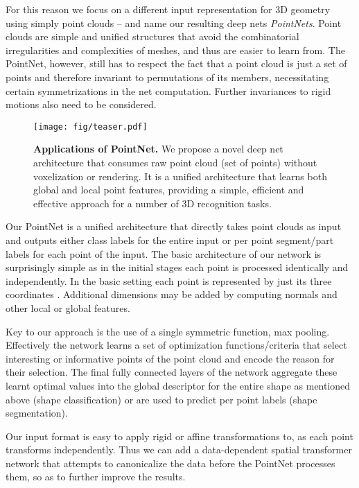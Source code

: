 \documentclass[10pt,twocolumn,letterpaper]{article}
\begin{document}
For this reason we focus on a different input representation for 3D geometry using simply point clouds -- and name our resulting deep nets {\em PointNets}. Point clouds are simple and unified structures that avoid the combinatorial irregularities and complexities of meshes, and thus are easier to learn from. The PointNet, however, still has to respect the fact that a point cloud is just a set of points and therefore invariant to permutations of its members, necessitating certain symmetrizations in the net computation. Further invariances to rigid motions also need to be considered. 


\begin{figure}
    \centering
    \texttt{[image: fig/teaser.pdf]}
    \caption{\textbf{Applications of PointNet.} We propose a novel deep net architecture that consumes raw point cloud (set of points) without voxelization or rendering. It is a unified architecture that learns both global and local point features, providing a simple, efficient and effective approach for a number of 3D recognition tasks.}
    \label{fig:teaser}
\end{figure}

Our PointNet is a unified architecture that directly takes point clouds as input and outputs either class labels for the entire input or per point segment/part labels for each point of the input. The basic architecture of our network is surprisingly simple as in the initial stages each point is processed identically and independently. In the basic setting each point is represented by just its three coordinates . Additional dimensions may be added by computing normals and other local or global features. 

Key to our approach is the use of a single symmetric function, max pooling. Effectively the network learns a set of optimization functions/criteria that select interesting or informative points of the point cloud and encode the reason for their selection. The final fully connected layers of the network aggregate these learnt optimal values into the global descriptor for the entire shape as mentioned above (shape classification) or are used to predict per point labels (shape segmentation). 

Our input format is easy to apply rigid or affine transformations to, as each point transforms independently. Thus we can add a data-dependent spatial transformer network that attempts to canonicalize the data before the PointNet processes them, so as to further improve the results. 
\end{document}
